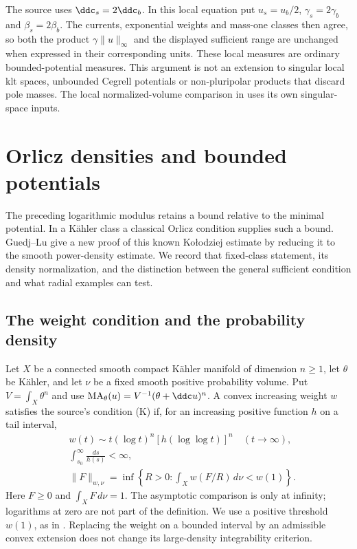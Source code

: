 The source uses $\ddc_s=2\ddc_b$. In this local equation put
$u_s=u_b/2$, $\gamma_s=2\gamma_b$ and
$\beta_s=2\beta_b$. The currents, exponential weights and
mass-one classes then agree, so both the product
$\gamma\|u\|_\infty$ and the displayed sufficient range
are unchanged when expressed in their corresponding units.
These local measures are ordinary bounded-potential measures.
This argument is not an extension to singular local klt spaces,
unbounded Cegrell potentials or non-pluripolar products that
discard pole masses. The local normalized-volume comparison in
 uses its own singular-space inputs.

\section{Orlicz densities and bounded potentials}
\label{sec:ytd-orlicz-boundedness}

The preceding logarithmic modulus retains a bound relative to the minimal
potential. In a K\"ahler class a classical Orlicz condition supplies such
a bound. Guedj--Lu \cite[Theorem~A]{GuedjLu25FromYauV2} give a new
proof of this known Ko\l odziej estimate by reducing it to the smooth
power-density estimate. We record that fixed-class statement, its density
normalization, and the distinction between the general sufficient
condition and what radial examples can test.

\subsection{The weight condition and the probability density}
\label{sec:ytd-orlicz-K}

Let $X$ be a connected smooth compact K\"ahler manifold of dimension
$n\geq1$, let $\theta$ be K\"ahler, and let $\nu$ be a fixed smooth
positive probability volume. Put $V=\int_X\theta^n$ and use
$\operatorname{MA}_\theta(u)=V^{-1}(\theta+\ddc u)^n$.
A convex increasing weight $w$ satisfies the source's condition (K) if,
for an increasing positive function $h$ on a tail interval,
\[
\tag{68.23y}\label{eq:ytd-orlicz-weight-condition}
 \begin{aligned}
 &w(t)\sim t(\log t)^n[h(\log\log t)]^n\quad(t\longrightarrow\infty),
 \\
 &\int_{s_0}^{\infty}\frac{ds}{h(s)}<\infty,\\
 &\|F\|_{w,\nu}
  =\inf\left\{R>0:\int_Xw(F/R)\,d\nu<w(1)\right\}.
 \end{aligned}
\]
Here $F\geq0$ and $\int_XF\,d\nu=1$. The asymptotic comparison is
only at infinity; logarithms at zero are not part of the definition.
We use a positive threshold $w(1)$, as in
\cite[Definition~1.5]{GuedjLu25FromYauV2}. Replacing the weight on a
bounded interval by an admissible convex extension does not change its
large-density integrability criterion.

